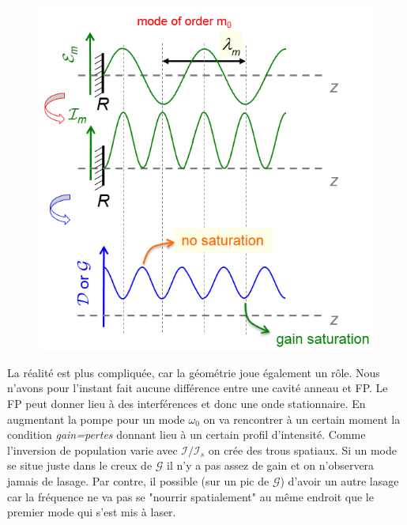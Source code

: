 	\begin{figure}
	\vspace{-5mm}
	\includegraphics[scale=0.55]{ch3/image15.png}
	\end{figure}
La réalité est plus compliquée, car la géométrie joue également un rôle. Nous n'avons pour l'instant
fait aucune différence entre une cavité anneau et FP. Le FP peut donner lieu à des interférences et 
donc une onde stationnaire. En augmentant la pompe pour un mode $\omega_0$ on va rencontrer à un 
certain moment la condition \textit{gain=pertes} donnant lieu à un certain profil d'intensité. Comme 
l'inversion de population varie avec $\mathcal{I}/\mathcal{I}_s$ on crée des trous spatiaux. Si un 
mode se situe juste dans le creux de $\mathcal{G}$ il n'y a pas assez de gain et on n'observera 
jamais de lasage. Par contre, il possible (sur un pic de $\mathcal{G}$) d'avoir un autre lasage car 
la fréquence ne va pas se "nourrir spatialement" au même endroit que le premier mode qui s'est mis à
laser.



































